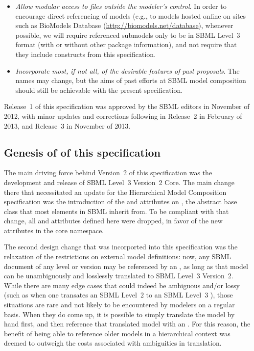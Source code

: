 \begin{itemize}
\item \emph{Allow modular access to files outside the modeler's control}.  In order to encourage direct referencing of models (e.g., to models hosted online on sites such as BioModels Database (\url{http://biomodels.net/database}), whenever possible, we will require referenced submodels only to be in SBML Level~3 format (with or without other package information), and not require that they include constructs from this specification.

\item \emph{Incorporate most, if not all, of the desirable features of past proposals}. The names may change, but the aims of past efforts at SBML model composition should still be achievable with the present specification.

\end{itemize}

\begin{blockChanged}
Release~1 of this specification was approved by the SBML editors in November of 2012, with minor updates and corrections following in Release~2 in February of 2013, and Release~3 in November of 2013.

\subsection{Genesis of  of this specification}

The main driving force behind Version~2 of this specification was the development and release of SBML Level~3 Version~2 Core.  The main change there that necessitated an update for the Hierarchical Model Composition specification was the introduction of the  and  attributes on \SBase, the abstract base class that most elements in SBML inherit from.  To be compliant with that change, all  and  attributes defined here were dropped, in favor of the new attributes in the core namespace.

The second design change that was incorported into this specification was the relaxation of the restrictions on external model definitions:  now, any SBML document of any level or version may be referenced by an \ExternalModelDefinition, as long as that model can be unambiguously and losslessly translated to SBML Level~3 Version~2.  While there are many edge cases that could indeed be ambiguous and/or lossy (such as when one transates an SBML Level~2 \StoichiometryMath to an SBML Level~3 \Rule), those situations are rare and not likely to be encountered by modelers on a regular basis.  When they do come up, it is possible to simply translate the model by hand first, and then reference that translated model with an \ExternalModelDefinition.  For this reason, the benefit of being able to reference older models in a hierarchical context was deemed to outweigh the costs associated with ambiguities in translation.

\end{blockChanged}
